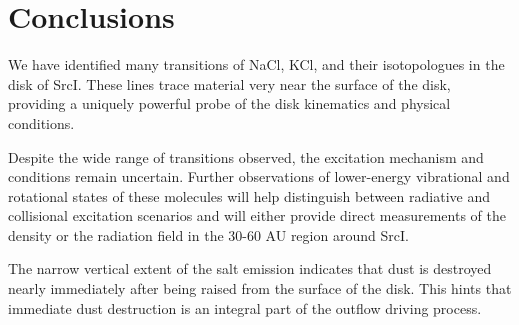 \documentclass[twocolumn]{aastex62}
\newcommand{\sourcei}{SrcI\xspace}
\begin{document}








\section{Conclusions}
We have identified many transitions of NaCl, KCl, and their isotopologues in
the disk of \sourcei.  These lines trace material very near the surface of the
disk, providing a uniquely powerful probe of the disk kinematics and physical
conditions.

Despite the wide range of transitions observed, the excitation mechanism and
conditions remain uncertain.  Further observations of lower-energy vibrational
and rotational states of these molecules will help distinguish between
radiative and collisional excitation scenarios and will either provide
direct measurements of the density or the radiation field in the 30-60 AU
region around \sourcei.

The narrow vertical extent of the salt emission indicates that dust is
destroyed nearly immediately after being raised from the surface of the disk.
This hints that immediate dust destruction is an integral part of the outflow
driving process.


\end{document}
